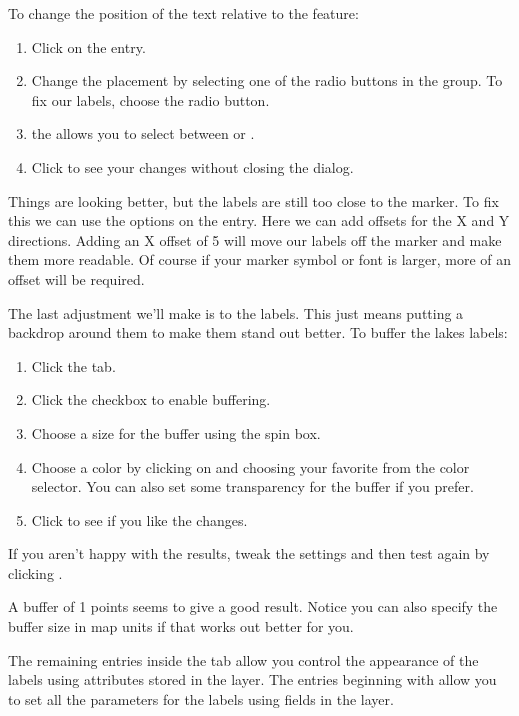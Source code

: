 To change the position of the text relative to the feature:

\begin{enumerate} 
\item Click on the  entry.
\item Change the placement by selecting one of the radio buttons
in the  group. To fix our labels, choose the
 radio button.
\item the  allows you to select between
 or .
\item Click  to see your changes without closing the dialog.
\end{enumerate} 

Things are looking better, but the labels are still too close to the marker. To
fix this we can use the options on the  entry. Here we can add
offsets for the X and Y directions. Adding an X offset of 5 will move our
labels off the marker and make them more readable. Of course if your marker
symbol or font is larger, more of an offset will be required.

The last adjustment we'll make is to  the labels. This just means
putting a backdrop around them to make them stand out better. To buffer the
lakes labels:

\begin{enumerate}
\item Click the  tab.
\item Click the  checkbox to enable buffering.
\item Choose a size for the buffer using the spin box.
\item Choose a color by clicking on  and choosing your
  favorite from the color selector. You can also set some transparency for the
  buffer if you prefer.
\item Click  to see if you like the changes.
\end{enumerate} 

If you aren't happy with the results, tweak the settings and then test again
by clicking .

A buffer of 1 points seems to give a good result.
Notice you can also specify the buffer size in map units if that works out
better for you.

The remaining entries inside the  tab allow you control the appearance of the
labels using attributes stored in the layer. The entries beginning with  allow you to
set all the parameters for the labels using fields in the layer.

